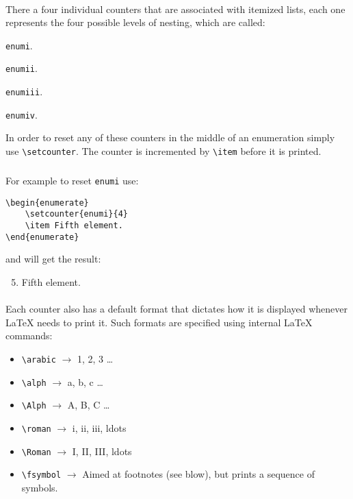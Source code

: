 {\paragraph{}
There a four individual counters that are associated with itemized lists,
each one represents the four possible levels of nesting, which are called:
\begin{my_enumerate}
	\item \verb|enumi|.
	\item \verb|enumii|.
	\item \verb|enumiii|.
	\item \verb|enumiv|.
\end{my_enumerate}
In order to reset any of these counters in the middle of an enumeration
simply use \verb|\setcounter|. The counter is incremented by \verb|\item|
before it is printed.
\subparagraph{}
For example to reset \verb|enumi| use:
\begin{verbatim}
\begin{enumerate}
	\setcounter{enumi}{4}
	\item Fifth element.
\end{enumerate}
\end{verbatim}
and will get the result:
\begin{enumerate}
	\setcounter{enumi}{4}
	\item Fifth element.
\end{enumerate}

\paragraph{}
Each counter also has a default format that dictates how it is displayed
whenever \LaTeX{} needs to print it. Such formats are specified using internal
\LaTeX{} commands:
\begin{itemize}
	\itemsep1pt \parskip0pt 
	\item \verb|\arabic| $\rightarrow$ 1, 2, 3 \ldots
	\item \verb|\alph| $\rightarrow$ a, b, c \ldots
	\item \verb|\Alph| $\rightarrow$ A, B, C \ldots
	\item \verb|\roman| $\rightarrow$ i, ii, iii, ldots
	\item \verb|\Roman| $\rightarrow$ I, II, III, ldots
	\item \verb|\fsymbol| $\rightarrow$ Aimed at footnotes (see blow), but
		prints a sequence of symbols.
\end{itemize}

}
